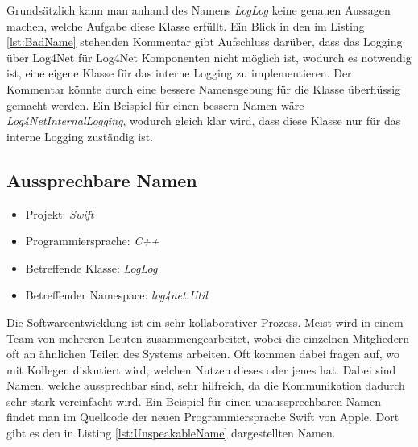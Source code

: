 \SuperPar Grundsätzlich kann man anhand des Namens \textit{LogLog} keine genauen Aussagen machen, welche Aufgabe diese Klasse erfüllt. Ein Blick in den im Listing \ref{lst:BadName} stehenden Kommentar gibt Aufschluss darüber, dass das Logging über Log4Net für Log4Net Komponenten nicht möglich ist, wodurch es notwendig ist, eine eigene Klasse für das interne Logging zu implementieren. Der Kommentar könnte durch eine bessere Namensgebung für die Klasse überflüssig gemacht werden. Ein Beispiel für einen bessern Namen wäre \textit{Log4NetInternalLogging}, wodurch gleich klar wird, dass diese Klasse nur für das interne Logging zuständig ist. 

\subsection{Aussprechbare Namen}
\begin{itemize}
	\item Projekt: \textit{Swift}
	\item Programmiersprache: \textit{C++}
	\item Betreffende Klasse: \textit{LogLog}
	\item Betreffender Namespace: \textit{log4net.Util}
\end{itemize}

\SuperPar Die Softwareentwicklung ist ein sehr kollaborativer Prozess. Meist wird in einem Team von mehreren Leuten zusammengearbeitet, wobei die einzelnen
Mitgliedern oft an ähnlichen Teilen des Systems arbeiten. Oft kommen dabei fragen auf, wo mit Kollegen diskutiert wird, welchen Nutzen dieses
oder jenes hat. Dabei sind Namen, welche aussprechbar sind, sehr hilfreich, da die Kommunikation dadurch sehr stark vereinfacht wird. Ein Beispiel
für einen unaussprechbaren Namen findet man im Quellcode der neuen Programmiersprache Swift von Apple. Dort gibt es den in Listing \ref{lst:UnspeakableName} 
dargestellten Namen.

\begin{lstlisting}[language={[Sharp]C}, caption=Unaussprechlicher Name, label=lst:UnspeakableName]
\end{lstlisting}